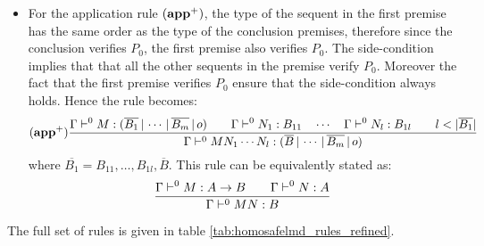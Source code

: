\begin{itemize}
\item For the application rule $\mathbf{(app^+)}$, the type of the sequent in the first premise has the same order
as the type of the conclusion premises, therefore since the conclusion verifies $P_0$, the first premise also verifies $P_0$.
The side-condition implies that that all the other sequents in the premise verify $P_0$. Moreover the fact
that the first premise verifies $P_0$ ensure that the side-condition always holds. Hence the rule becomes:
$$ \mathbf{(app^+)}
    \frac{\displaystyle 
        \Gamma \vdash^0 M : (\overline{B_1} \, | \, \cdots \, | \, \overline{B_m} \, | \, o) \qquad
        \Gamma \vdash^0 N_1 : B_{11} \quad \cdots \quad \Gamma \vdash^0 N_{l} : B_{1l} \qquad l < |\overline{B_1}|
    }{
        \Gamma \vdash^0 M N_1 \cdots N_{l} : (\overline{B} \, | \, \cdots \, | \, \overline{B_m} \, | \, o)
    }
$$
where $\overline{B_1} = B_{11}, \ldots, B_{1l},\overline{B}$.
This rule can be equivalently stated as:
$$ \frac{\displaystyle \Gamma \vdash^0 M : A\rightarrow B
                                        \qquad \Gamma \vdash^{0} N : A
                                   }{\Gamma  \vdash^{0} M N : B}$$
\end{itemize}

The full set of rules is given in table \ref{tab:homosafelmd_rules_refined}.


